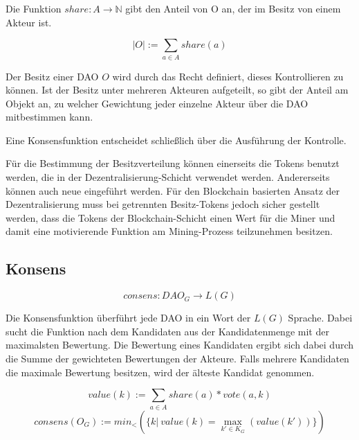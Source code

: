 \documentclass[a4paper,12pt]{report}
\begin{document}
Die Funktion $share: A \rightarrow \mathbb{N}$ gibt den Anteil von O an, der im Besitz von einem Akteur ist. 

\[ |O| := \sum_{a \in A} share(a) \] 

Der Besitz einer DAO $O$ wird durch das Recht definiert, dieses Kontrollieren zu können\cite{Waldron2004}. Ist der Besitz unter mehreren Akteuren aufgeteilt, so gibt der Anteil am Objekt an, zu welcher Gewichtung jeder einzelne Akteur über die DAO mitbestimmen kann.

Eine Konsensfunktion entscheidet schließlich über die Ausführung der Kontrolle.

Für die Bestimmung der Besitzverteilung können einerseits die Tokens benutzt werden, die in der Dezentralisierung-Schicht verwendet werden. Andererseits können auch neue eingeführt werden. Für den Blockchain basierten Ansatz der Dezentralisierung muss bei getrennten Besitz-Tokens jedoch sicher gestellt werden, dass die Tokens der Blockchain-Schicht einen Wert für die Miner und damit eine motivierende Funktion am Mining-Prozess teilzunehmen besitzen. 

% 




\subsection*{Konsens}

  \[consens: DAO_G \rightarrow L(G)\] 


Die Konsensfunktion überführt jede DAO in ein Wort der $L(G)$ Sprache.
Dabei sucht die Funktion nach dem Kandidaten aus der Kandidatenmenge mit der maximalsten Bewertung. Die Bewertung eines Kandidaten ergibt sich dabei durch die Summe der gewichteten Bewertungen der Akteure. Falls mehrere Kandidaten die maximale Bewertung besitzen, wird der älteste Kandidat genommen.

\[ value(k) := \sum_{a\in A} share(a) * vote(a,k) \] 
\[ consens (O_G) := min_<(\{ k |\ value(k) = \max_{k'\in K_G} (value(k')) \}) \]



\end{document}

